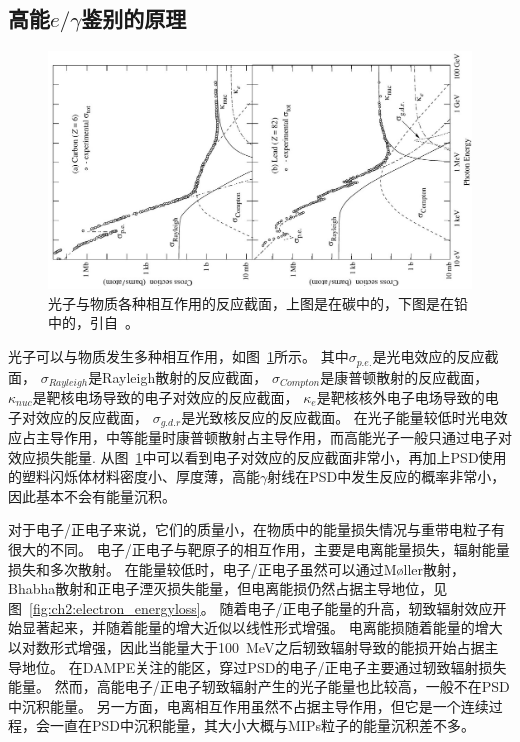\subsection{高能$e/\gamma$鉴别的原理}
\begin{figure}[h!]
	\centering
	\includegraphics[width=1.2\linewidth,angle=270]{chap/description/fig/photon_energyloss}
	\caption{光子与物质各种相互作用的反应截面，上图是在碳中的，下图是在铅中的，引自~\parencite{pdg_book}。}
	\label{fig:ch2:photon_energyloss}
\end{figure}

光子可以与物质发生多种相互作用，如图~\ref{fig:ch2:photon_energyloss}所示。
其中${\sigma}_{p.e.}$是光电效应的反应截面，
${\sigma}_{Rayleigh}$是Rayleigh散射的反应截面， 
${\sigma}_{Compton}$是康普顿散射的反应截面，
${\kappa}_{nuc}$是靶核电场导致的电子对效应的反应截面，
${\kappa}_e$是靶核核外电子电场导致的电子对效应的反应截面，
${\sigma}_{g.d.r}$是光致核反应的反应截面。
在光子能量较低时光电效应占主导作用，中等能量时康普顿散射占主导作用，而高能光子一般只通过电子对效应损失能量.
从图~\ref{fig:ch2:photon_energyloss}中可以看到电子对效应的反应截面非常小，再加上PSD使用的塑料闪烁体材料密度小、厚度薄，高能$\gamma$射线在PSD中发生反应的概率非常小，因此基本不会有能量沉积。

对于电子/正电子来说，它们的质量小，在物质中的能量损失情况与重带电粒子有很大的不同。
电子/正电子与靶原子的相互作用，主要是电离能量损失，辐射能量损失和多次散射。
在能量较低时，电子/正电子虽然可以通过Møller散射，Bhabha散射和正电子湮灭损失能量，但电离能损仍然占据主导地位，见图~\ref{fig:ch2:electron_energyloss}。
随着电子/正电子能量的升高，轫致辐射效应开始显著起来，并随着能量的增大近似以线性形式增强。
电离能损随着能量的增大以对数形式增强，因此当能量大于\SI{100}{MeV}之后轫致辐射导致的能损开始占据主导地位。
在DAMPE关注的能区，穿过PSD的电子/正电子主要通过轫致辐射损失能量。
然而，高能电子/正电子轫致辐射产生的光子能量也比较高，一般不在PSD中沉积能量。
另一方面，电离相互作用虽然不占据主导作用，但它是一个连续过程，会一直在PSD中沉积能量，其大小大概与MIPs粒子的能量沉积差不多。

